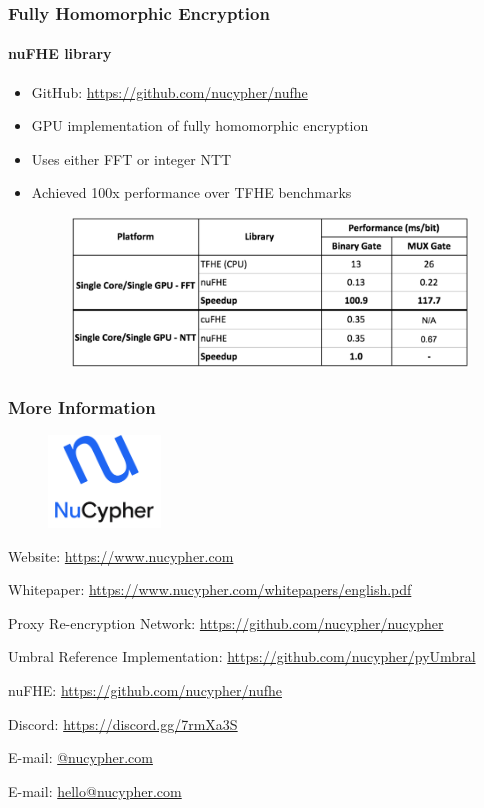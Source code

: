 \documentclass[xetex,mathsans,sans,aspectratio=169]{beamer}
\begin{document}
    \begin{frame}
      \frametitle{Fully Homomorphic Encryption}
       \framesubtitle{nuFHE library}
       \begin{itemize}
           \item GitHub: \url{https://github.com/nucypher/nufhe}
           \item GPU implementation of fully homomorphic encryption
           \item Uses either FFT or integer NTT
           \item Achieved 100x performance over TFHE benchmarks
           \begin{figure}
               \includegraphics[width=10.5cm]{pdf/nufhe-benchmarks.pdf}
           \end{figure}
       \end{itemize}
     \end{frame}

    \begin{frame}
        \frametitle{More Information}
        \begin{figure}
            \centering
            \includegraphics[width=3cm]{pdf/nucypher_logo.pdf}
        \end{figure}
        Website: \url{https://www.nucypher.com}

        Whitepaper: \url{https://www.nucypher.com/whitepapers/english.pdf}

        Proxy Re-encryption Network: \url{https://github.com/nucypher/nucypher}

        Umbral Reference Implementation: \url{https://github.com/nucypher/pyUmbral}

        nuFHE: \url{https://github.com/nucypher/nufhe}

        Discord: \url{https://discord.gg/7rmXa3S}

        E-mail: \href{mailto:\emailname @nucypher.com}{\emailname @nucypher.com}

        E-mail: \href{mailto:hello@nucypher.com}{hello@nucypher.com}
    \end{frame}
\end{document}
